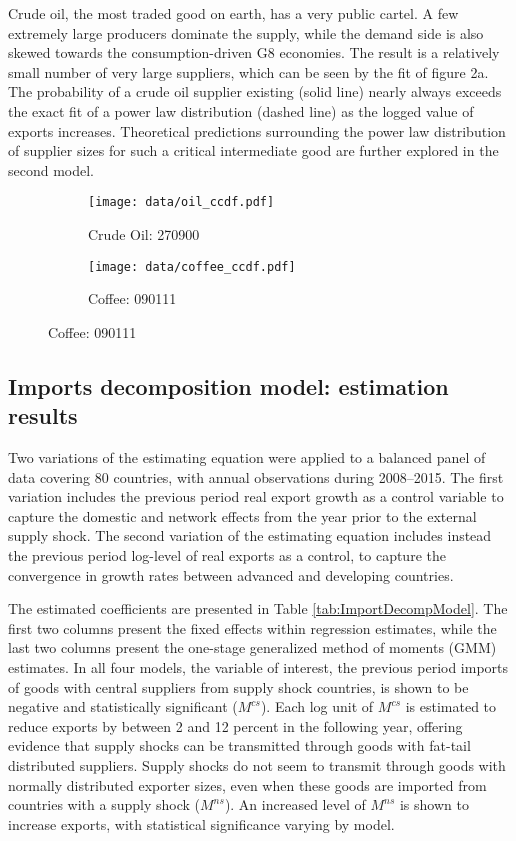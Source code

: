 \documentclass[10pt,letterpaper]{article}
\begin{document}
Crude oil, the most traded good on earth, has a very public cartel. A few extremely large producers dominate the supply, while the demand side is also skewed towards the consumption-driven G8 economies. The result is a relatively small number of very large suppliers, which can be seen by the fit of figure 2a. The probability of a crude oil supplier existing (solid line) nearly always exceeds the exact fit of a power law distribution (dashed line) as the logged value of exports increases. Theoretical predictions surrounding the power law distribution of supplier sizes for such a critical intermediate good are further explored in the second model. 

\begin{figure}[h]
  \caption{Sample fit to distribution for two products, 2014}
  \centering
  \begin{subfigure}[b]{0.49\textwidth}
  \texttt{[image: data/oil\_ccdf.pdf]} 
  \caption{Crude Oil: 270900}
  \end{subfigure}
  \begin{subfigure}[b]{0.49\textwidth}
  \texttt{[image: data/coffee\_ccdf.pdf]} 
  \caption{Coffee: 090111}
  \end{subfigure}  
\end{figure}

\subsection{Imports decomposition model: estimation results}

Two variations of the estimating equation were applied to a balanced panel of data covering 80 countries, with annual observations during 2008--2015. The first variation includes the previous period real export growth as a control variable to capture the domestic and network effects from the year prior to the external supply shock. The second variation of the estimating equation includes instead the previous period log-level of real exports as a control, to capture the convergence in growth rates between advanced and developing countries. 

The estimated coefficients are presented in Table \ref{tab:ImportDecompModel}. The first two columns present the fixed effects within regression estimates, while the last two columns present the one-stage generalized method of moments (GMM) estimates. In all four models, the variable of interest, the previous period imports of goods with central suppliers from supply shock countries, is shown to be negative and statistically significant ($M^{cs}$). Each log unit of $M^{cs}$ is estimated to reduce exports by between 2 and 12 percent in the following year, offering evidence that supply shocks can be transmitted through goods with fat-tail distributed suppliers. Supply shocks do not seem to transmit through goods with normally distributed exporter sizes, even when these goods are imported from countries with a supply shock ($M^{ns}$). An increased level of $M^{ns}$ is shown to increase exports, with statistical significance varying by model. 
\end{document}
